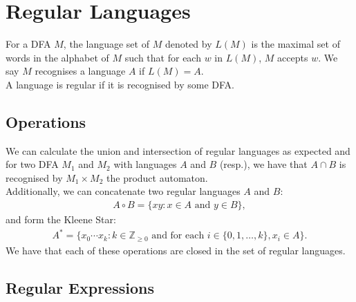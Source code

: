 \section{Regular Languages}

For a DFA $M$, the language set of $M$ denoted by $L(M)$
is the maximal set of words in the alphabet of $M$ such that
for each $w$ in $L(M)$, $M$ accepts $w$. We say $M$ recognises
a language $A$ if $L(M) = A$.
\\[\baselineskip]
A language is regular if it is recognised by some DFA.

\subsection{Operations}

We can calculate the union and intersection of regular languages
as expected and for two DFA $M_1$ and $M_2$ with languages
$A$ and $B$ (resp.), we have that $A \cap B$ is
recognised by $M_1 \times M_2$ the product automaton.
\\[\baselineskip]
Additionally, we can concatenate two regular languages $A$ and
$B$: \begin{gather*}
    A \circ B = \{xy : x \in A \text{ and } y \in B\},
\end{gather*} and form the Kleene Star: \begin{gather*}
    A^* = \{x_0 \cdots x_k : k \in \mathbb{Z}_{\geq 0}
        \text{ and for each } i \in \{0, 1, \ldots, k\}, 
        x_i \in A\}.
\end{gather*} We have that each of these operations are closed
in the set of regular languages.

\subsection{Regular Expressions}

